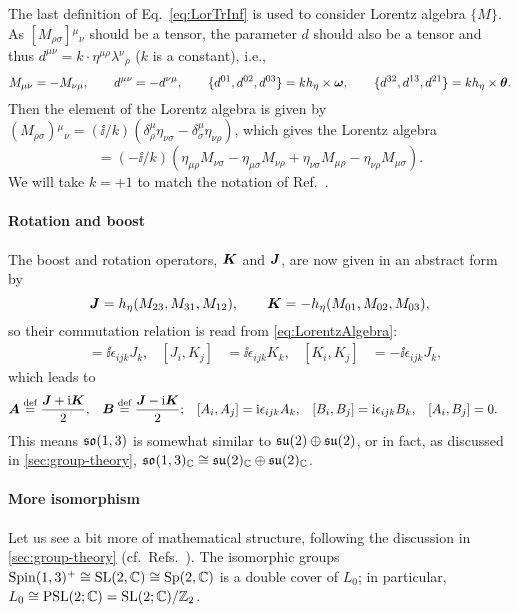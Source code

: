 \documentclass[CheatSheet]{subfiles}
\newcommand\defeq{\mathrel{\stackrel{\text{def}}=}}
\begin{document}
The last definition of Eq.~\eqref{eq:LorTrInf} is used to consider Lorentz algebra $\{M\}$.
As $[M_{\rho\sigma}]{}^\mu{}_\nu$ should be a tensor, the parameter $d$ should also be a tensor and thus $d^{\mu\nu}=k\cdot\eta^{\mu\rho}\lambda{}^\nu{}_\rho$ ($k$ is a constant), i.e.,
\begin{equation}
 M_{\mu\nu}=-M_{\nu\mu}, \qquad
 d^{\mu\nu}=-d^{\nu\mu}, \qquad
 \{d^{01},d^{02},d^{03}\}=kh_\eta\times{\boldsymbol{\omega}},\qquad
 \{d^{32},d^{13},d^{21}\}=kh_\eta\times{\boldsymbol{\theta}}.
\end{equation}
Then the element of the Lorentz algebra is given by
$ (M_{\rho\sigma}){}^\mu{}_\nu=
(\ii/k)(\delta^\mu_\rho\eta_{\nu\sigma}-\delta^\mu_\sigma \eta_{\nu\rho})
$, which gives the Lorentz algebra
\begin{equation}
[M_{\mu\nu},M_{\rho\sigma}] = 
(-\ii/k)\left(\eta_{\mu\rho}M_{\nu\sigma}-\eta_{\mu\sigma}M_{\nu\rho}
+\eta_{\nu\sigma}M_{\mu\rho}-\eta_{\nu\rho}M_{\mu\sigma}
\right).
\label{eq:LorentzAlgebra}
\end{equation}
We will take $k=+1$ to match the notation of Ref.~\cite{Kugo1}.

\paragraph{Rotation and boost}
The boost and rotation operators, ${\boldsymbol{K}}$ and ${\boldsymbol{J}}$, are now given in an abstract form by
\begin{equation}
 {\boldsymbol{J}} = h_\eta (M_{23}, M_{31}, M_{12}), \qquad
 {\boldsymbol{K}} = -h_\eta(M_{01}, M_{02}, M_{03}),
\end{equation}
so their commutation relation is read from \cref{eq:LorentzAlgebra}:
\begin{align}
 [J_i, J_j] &= \ii \epsilon_{ijk}J_k,&
 [J_i, K_j] &= \ii \epsilon_{ijk}K_k,&
 [K_i, K_j] &= -\ii \epsilon_{ijk}J_k,
\end{align}
which leads to
\begin{align}
 \vc A&\defeq\frac{\vc J+\ii \vc K}{2},&
 \vc B&\defeq\frac{\vc J-\ii \vc K}{2};&
 [A_i, A_j] &= \ii \epsilon_{ijk}A_k,&
 [B_i, B_j] &= \ii \epsilon_{ijk}B_k,&
 [A_i, B_j] &= 0.
\end{align}
This means $\operatorname{\mathfrak{so}}(1,3)$ is somewhat similar to $\operatorname{\mathfrak{su}}(2)\oplus \operatorname{\mathfrak{su}}(2)$, or in fact,
as discussed in \cref{sec:group-theory},
$\operatorname{\mathfrak{so}}(1,3)_{\mathbb C}\cong \operatorname{\mathfrak{su}}(2)_{\mathbb C}\oplus\operatorname{\mathfrak{su}}(2)_{\mathbb C}$.

\paragraph{More isomorphism}
Let us see a bit more of  mathematical structure, following the discussion in \cref{sec:group-theory} (cf.~Refs.~\cite{RauschdeTraubenberg:2005aa,Yamaguchi:spinor}).
The isomorphic groups
$\mathop{\mathrm{Spin}}(1,3)^+\cong\operatorname{\mathrm SL}(2,\mathbb C)\cong\operatorname{\mathrm Sp}(2,\mathbb C)$
is a double cover of $L_0$;
in particular, $L_0\cong \mathop{\mathrm{PSL}}(2;\mathbb C)=\operatorname{\mathrm SL}(2;\mathbb C)/\mathbb Z_2$.
\end{document}
